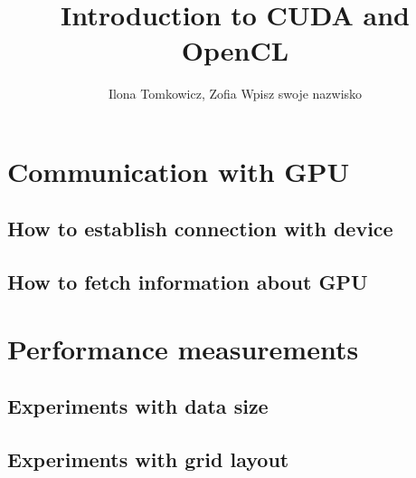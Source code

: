 \documentclass[12pt]{article}
\begin{document}
\title{Introduction to CUDA and OpenCL}
\author{Ilona Tomkowicz, Zofia Wpisz swoje nazwisko}

\maketitle
\tableofcontents
\newpage

\section{Communication with GPU} \label{gpu_communication}
\subsection{How to establish connection with device} \label{ht_open_connection}
\subsection{How to fetch information about GPU} \label{fetch_info}
\section{Performance measurements}  \label{performance}
\subsection{Experiments with data size}  \label{size_tests}
\subsection{Experiments with grid layout} \label{layout_tests}
\end{document}
